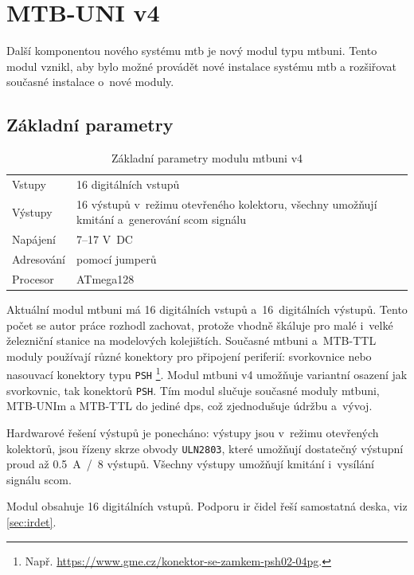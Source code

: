\newpage
\section{MTB-UNI v4}

Další komponentou nového systému \gls{mtb} je nový modul typu \gls{mtbuni}.
Tento modul vznikl, aby bylo možné provádět nové instalace systému \gls{mtb}
a rozšiřovat současné instalace o~nové moduly.

\subsection{Základní parametry}

\begin{table}[h]
	\begin{tabularx}{\textwidth}{lX}
		\toprule
		Vstupy & 16 digitálních vstupů \\
		Výstupy & 16 výstupů v~režimu otevřeného kolektoru, všechny umožňují
		kmitání a~generování \gls{scom} signálu \\
		Napájení & 7–17 V~DC \\
		Adresování & pomocí jumperů \\
		Procesor & ATmega128 \\
		\bottomrule
	\end{tabularx}
	\caption{Základní parametry modulu \gls{mtbuni} v4}
	\label{tab:mtbuni-params}
\end{table}

Aktuální modul \gls{mtbuni} má 16 digitálních vstupů a~16~digitálních výstupů.
Tento počet se autor práce rozhodl zachovat, protože vhodně škáluje pro malé
i~velké železniční stanice na modelových kolejištích.
Současné \gls{mtbuni} a~MTB-TTL moduly používají různé konektory
pro připojení periferií: svorkovnice nebo nasouvací konektory typu \texttt{PSH}
\footnote{Např. \url{https://www.gme.cz/konektor-se-zamkem-psh02-04pg}.}.
Modul \gls{mtbuni} v4 umožňuje variantní osazení jak svorkovnic, tak konektorů
\texttt{PSH}. Tím modul slučuje současné moduly \gls{mtbuni}, MTB-UNIm a
MTB-TTL do jediné \gls{dps}, což zjednodušuje údržbu a~vývoj.

Hardwarové řešení výstupů je ponecháno: výstupy jsou v~režimu otevřených
kolektorů, jsou řízeny skrze obvody \texttt{ULN2803}, které umožňují
dostatečný výstupní proud až 0.5~A~/~8 výstupů. Všechny výstupy umožňují kmitání
i~vysílání signálu \gls{scom}.

Modul obsahuje 16 digitálních vstupů. Podporu \gls{ir} čidel řeší samostatná
deska, viz \ref{sec:irdet}.

